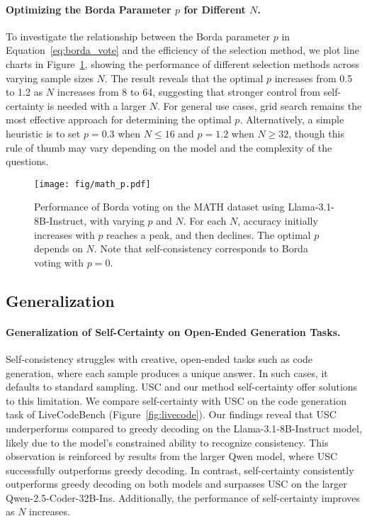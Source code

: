\paragraph{Optimizing the Borda Parameter \(p\) for Different \(N\).}
To investigate the relationship between the Borda parameter \(p\) in Equation~\ref{eq:borda_vote} and the efficiency of the selection method, we plot line charts in Figure~\ref{fig:math_p}, showing the performance of different selection methods across varying sample sizes \(N\). The result reveals that the optimal \(p\) increases from 0.5 to 1.2 as \(N\) increases from 8 to 64, suggesting that stronger control from self-certainty is needed with a larger \(N\). For general use cases, grid search remains the most effective approach for determining the optimal $p$. Alternatively, a simple heuristic is to set \(p = 0.3\) when \(N\leq 16\) and \( p = 1.2\) when \(N\geq 32\), though this rule of thumb may vary depending on the model and the complexity of the questions.

\begin{figure}[t]
    \centering
    \texttt{[image: fig/math\_p.pdf]}
    \vspace{-1em}
    \caption{Performance of Borda voting on the MATH dataset using Llama-3.1-8B-Instruct, with varying \( p \) and \( N \). For each $N$, accuracy initially increases with $p$ reaches a peak, and then declines. The optimal \( p \) depends on \( N \). Note that self-consistency corresponds to Borda voting with \( p = 0 \).}
    \label{fig:math_p}
\end{figure}

\subsection{Generalization}
\paragraph{Generalization of Self-Certainty on Open-Ended Generation Tasks.}
Self-consistency struggles with creative, open-ended tasks such as code generation, where each sample produces a unique answer. In such cases, it defaults to standard sampling. USC and our method self-certainty offer solutions to this limitation. We compare self-certainty with USC on the code generation task of LiveCodeBench (Figure~\ref{fig:livecode}). Our findings reveal that USC underperforms compared to greedy decoding on the Llama-3.1-8B-Instruct model, likely due to the model’s constrained ability to recognize consistency. This observation is reinforced by results from the larger Qwen model, where USC successfully outperforms greedy decoding. In contrast, self-certainty consistently outperforms greedy decoding on both models and surpasses USC on the larger Qwen-2.5-Coder-32B-Ins. Additionally, the performance of self-certainty improves as \(N\) increases.

